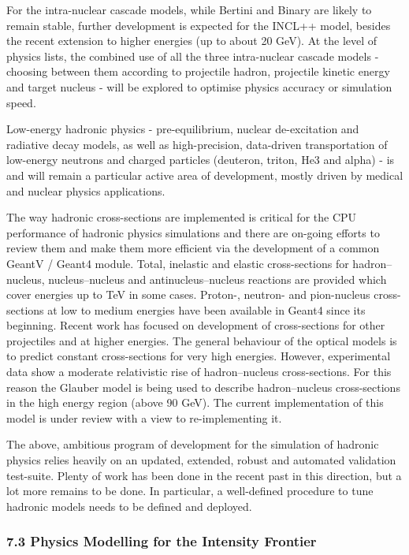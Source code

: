 \documentclass[12pt,a4paper]{article}
\begin{document}
For the intra-nuclear cascade models, while Bertini and Binary are
likely to remain stable, further development is expected for the INCL++
model, besides the recent extension to higher energies (up to about 20
GeV). At the level of physics lists, the combined use of all the three
intra-nuclear cascade models - choosing between them according to
projectile hadron, projectile kinetic energy and target nucleus - will
be explored to optimise physics accuracy or simulation speed.

Low-energy hadronic physics - pre-equilibrium, nuclear de-excitation and
radiative decay models, as well as high-precision, data-driven
transportation of low-energy neutrons and charged particles (deuteron,
triton, He3 and alpha) - is and will remain a particular active area of
development, mostly driven by medical and nuclear physics applications.

The way hadronic cross-sections are implemented is critical for the CPU
performance of hadronic physics simulations and there are on-going
efforts to review them and make them more efficient via the development
of a common GeantV / Geant4 module. Total, inelastic and elastic
cross-sections for hadron--nucleus, nucleus--nucleus and
antinucleus--nucleus reactions are provided which cover energies up to
TeV in some cases. Proton-, neutron- and pion-nucleus cross-sections at
low to medium energies have been available in Geant4 since its
beginning. Recent work has focused on development of cross-sections for
other projectiles and at higher energies. The general behaviour of the
optical models is to predict constant cross-sections for very high
energies. However, experimental data show a moderate relativistic rise
of hadron--nucleus cross-sections. For this reason the Glauber model is
being used to describe hadron--nucleus cross-sections in the high energy
region (above 90 GeV). The current implementation of this model is under
review with a view to re-implementing it.

The above, ambitious program of development for the simulation of
hadronic physics relies heavily on an updated, extended, robust and
automated validation test-suite. Plenty of work has been done in the
recent past in this direction, but a lot more remains to be done. In
particular, a well-defined procedure to tune hadronic models needs to be
defined and deployed.

\hypertarget{physics-modelling-for-the-intensity-frontier}{%
\subsubsection{7.3 Physics Modelling for the Intensity
Frontier}\label{physics-modelling-for-the-intensity-frontier}}
\end{document}
